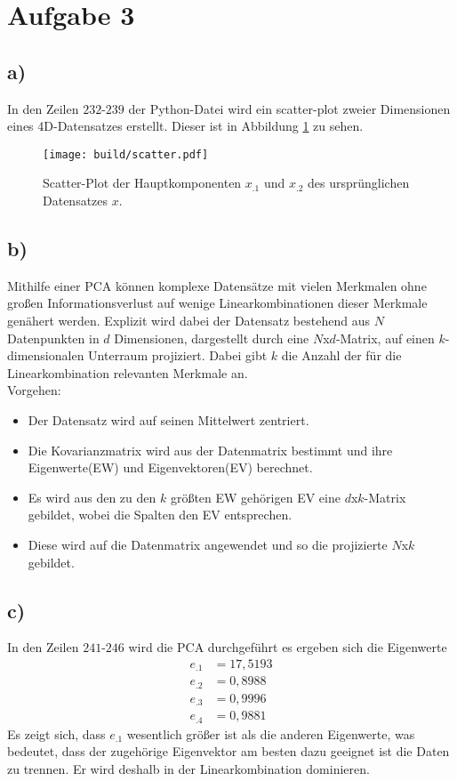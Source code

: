 \section{Aufgabe 3}
\label{sec:Aufgabe3}
\subsection*{a)}
In den Zeilen $232$-$239$ der Python-Datei wird ein scatter-plot zweier Dimensionen eines 4D-Datensatzes erstellt. Dieser ist in Abbildung \ref{fig:scatter} zu sehen. 
\begin{figure}
\centering
\texttt{[image: build/scatter.pdf]}
\caption{Scatter-Plot der Hauptkomponenten $x_.1$ und $x_.2$ des ursprünglichen Datensatzes $x$.}
\label{fig:scatter}
\end{figure}
\subsection*{b)}
Mithilfe einer PCA können komplexe Datensätze mit vielen Merkmalen ohne großen Informationsverlust auf wenige Linearkombinationen dieser Merkmale genähert werden.
Explizit wird dabei der Datensatz bestehend aus $N$ Datenpunkten in $d$ Dimensionen, dargestellt durch eine $N$x$d$-Matrix, auf einen $k$-dimensionalen Unterraum projiziert. Dabei gibt $k$ die Anzahl der für die Linearkombination relevanten Merkmale an.\\
Vorgehen:
\begin{itemize}
\item Der Datensatz wird auf seinen Mittelwert zentriert.
\item Die Kovarianzmatrix wird aus der Datenmatrix bestimmt und ihre Eigenwerte(EW) und Eigenvektoren(EV) berechnet.
\item Es wird aus den zu den $k$ größten EW gehörigen EV eine $d$x$k$-Matrix gebildet, wobei die Spalten den EV entsprechen.
\item Diese wird auf die Datenmatrix angewendet und so die projizierte $N$x$k$ gebildet.
\end{itemize}
\subsection*{c)}
In den Zeilen $241$-$246$ wird die PCA durchgeführt es ergeben sich die Eigenwerte
\begin{align*}
e_.1 &= 17,5193\\
e_.2 &= 0,8988\\
e_.3 &= 0,9996\\
e_.4 &= 0,9881
\end{align*}
Es zeigt sich, dass $e_.1$ wesentlich größer ist als die anderen Eigenwerte, was bedeutet, dass der zugehörige Eigenvektor am besten dazu geeignet ist die Daten zu trennen. Er wird deshalb in der Linearkombination dominieren.
